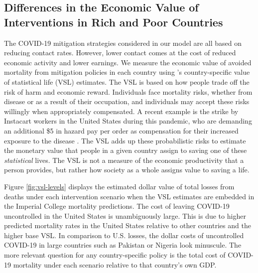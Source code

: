 \documentclass[11pt]{article}
\begin{document}
\subsection{Differences in the Economic Value of Interventions in Rich and Poor Countries}

The COVID-19 mitigation strategies considered in our model are all based on reducing contact rates. However, lower contact comes at the cost of reduced economic activity and lower earnings. We measure the economic value of avoided mortality from mitigation policies in each country using \textcite{viscusi2017}'s country-specific value of statistical life (VSL) estimates. The VSL is based on how people trade off the risk of harm and economic reward. Individuals face mortality risks, whether from disease or as a result of their occupation, and individuals may accept these risks willingly when appropriately compensated. A recent example is the strike by Instacart workers in the United States during this pandemic, who are demanding an additional \$5 in hazard pay per order as compensation for their increased exposure to the disease \parencite{wapo2020}. The VSL adds up these probabilistic risks to estimate the monetary value that people in a given country assign to saving one of these \textit{statistical} lives. The VSL is not a measure of the economic productivity that a person provides, but rather how society as a whole assigns value to saving a life.

Figure \ref{fig:vsl-levels} displays the estimated dollar value of total losses from deaths under each intervention scenario when the \textcite{viscusi2017} VSL estimates are embedded in the Imperial College mortality predictions. The cost of leaving COVID-19 uncontrolled in the United States is unambiguously large. This is due to higher predicted mortality rates in the United States relative to other countries and the higher base VSL. In comparison to U.S. losses, the dollar costs of uncontrolled COVID-19 in large countries such as Pakistan or Nigeria look minuscule. The more relevant question for any country-specific policy is the total cost of COVID-19 mortality under each scenario relative to that country's own GDP. 
\end{document}

